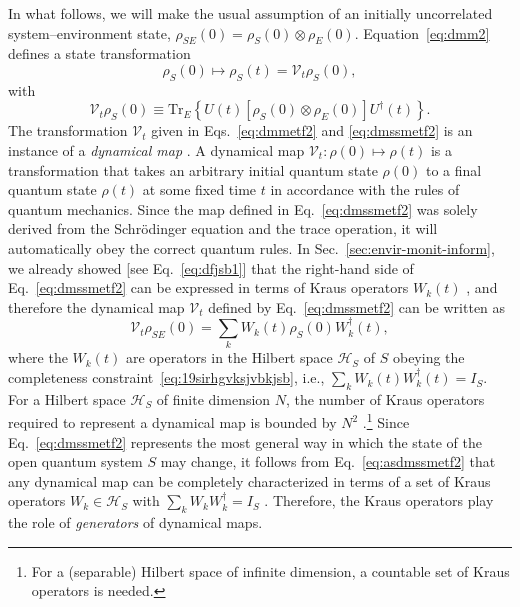 \documentclass[3p,sort&compress,12pt]{elsarticle}
\newcommand{\op}[1]{#1}
\begin{document}
In what follows, we will make the usual assumption of an initially uncorrelated system--environment state, $\op{\rho}_{SE}(0)=\op{\rho}_{S}(0)\otimes \op{\rho}_{E}(0)$. Equation~\eqref{eq:dmm2} defines a state transformation
%
\begin{equation}
\label{eq:dmmetf2}
\op{\rho}_{S}(0) \mapsto \op{\rho}_S(t) = \mathcal{V}_t \op{\rho}_{S}(0),
\end{equation}
%
with 
%
\begin{equation}
  \label{eq:dmssmetf2}
\mathcal{V}_t \op{\rho}_{S}(0) \equiv \text{Tr}_{E} \left\{ U(t) \left[\op{\rho}_{S}(0)\otimes \op{\rho}_{E}(0) \right]U^\dagger(t) \right\}.
\end{equation}
%
The transformation $\mathcal{V}_t$ given in Eqs.~\eqref{eq:dmmetf2} and \eqref{eq:dmssmetf2} is an instance of a \emph{dynamical map} \cite{Breuer:2002:oq,Alicki:2007:uu}. A dynamical map $\mathcal{V}_t : \op{\rho}(0) \mapsto \op{\rho}(t)$ is a transformation that takes an arbitrary initial quantum state $\op{\rho}(0)$ to a final quantum state $\op{\rho}(t)$ at some fixed time $t$ in accordance with the rules of quantum mechanics. Since the map defined in Eq.~\eqref{eq:dmssmetf2} was solely derived from the Schr\"odinger equation and the trace operation, it will automatically obey the correct quantum rules. In Sec.~\ref{sec:envir-monit-inform}, we already showed [see Eq.~\eqref{eq:dfjsb1}] that the right-hand side of Eq.~\eqref{eq:dmssmetf2} can be expressed in terms of Kraus operators $\op{W}_k(t)$ \cite{Kraus:1971:ii,Kraus:1983:ee}, and therefore the dynamical map $\mathcal{V}_t$ defined by Eq.~\eqref{eq:dmssmetf2} can be written as
%
\begin{equation}
  \label{eq:asdmssmetf2}
\mathcal{V}_t \op{\rho}_{SE}(0) = \sum_k W_k(t) \op{\rho}_S(0) W^\dagger_k(t),
\end{equation}
%
where the $\op{W}_k(t)$ are operators in the Hilbert space $\mathcal{H}_S$ of $S$ obeying the completeness constraint~\eqref{eq:19sirhgvksjvbkjsb}, i.e.,
$\sum_k W_k(t) W^\dagger_k(t) = I_S$. For a Hilbert space $\mathcal{H}_S$ of finite dimension $N$, the number of Kraus operators required to represent a dynamical map is bounded by $N^2$ \cite{Alicki:2007:uu}.\footnote{For a (separable) Hilbert space of infinite dimension, a countable set of Kraus operators is needed.} Since Eq.~\eqref{eq:dmssmetf2} represents the most general way in which the state of the open quantum system $S$ may change, it follows from Eq.~\eqref{eq:asdmssmetf2} that any dynamical map can be completely characterized in terms of a set of Kraus operators $\op{W}_k \in \mathcal{H}_S$ with $\sum_k W_k W^\dagger_k = I_S$ \cite{Kraus:1983:ee,Lindblad:1976:um,Breuer:2002:oq,Alicki:2007:uu}. Therefore, the Kraus operators play the role of \emph{generators} of dynamical maps.
\end{document}
